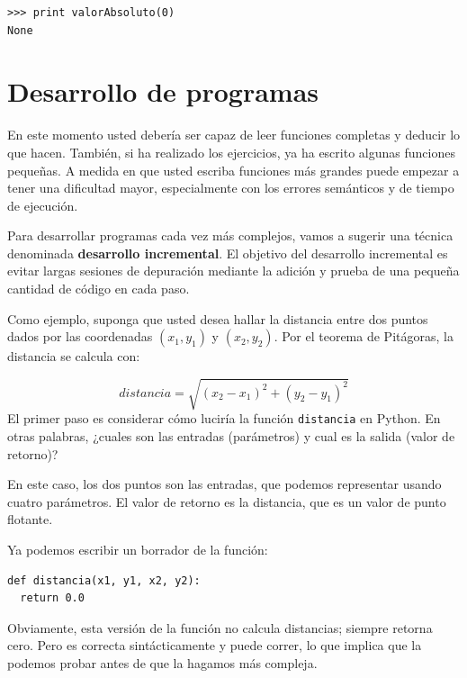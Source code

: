 
\beforeverb
\begin{verbatim}
>>> print valorAbsoluto(0)
None
\end{verbatim}
\afterverb



\section{Desarrollo de programas}
\label{program development}

En este momento usted debería ser capaz de leer funciones completas
y deducir lo que hacen. También, si ha realizado los ejercicios,
ya ha escrito algunas funciones pequeñas. A medida en que usted
escriba funciones más grandes puede empezar a tener una dificultad
mayor, especialmente con los errores semánticos y de tiempo de
ejecución.

Para desarrollar programas cada vez más complejos, vamos a sugerir
una técnica denominada {\bf desarrollo incremental}.  El objetivo
del desarrollo incremental es evitar largas sesiones de depuración
mediante la adición y prueba de una pequeña cantidad de código 
en cada paso.


Como ejemplo, suponga que usted desea hallar la distancia entre
dos puntos dados por las coordenadas  $(x_1, y_1)$ y $(x_2, y_2)$.
Por el teorema de Pitágoras, la distancia se calcula con:

\begin{equation}
distancia = \sqrt{(x_2 - x_1)^2 + (y_2 - y_1)^2}
\end{equation}
%
El primer paso es considerar cómo luciría la función \texttt{distancia}
en Python. En otras palabras, ¿cuales son las entradas (parámetros)
y cual es la salida (valor de retorno)?

En este caso, los dos puntos son las entradas, que podemos representar
usando cuatro parámetros. El valor de retorno es la distancia, que es
un valor de punto flotante.

Ya podemos escribir un borrador de la función:

\beforeverb
\begin{verbatim}
def distancia(x1, y1, x2, y2):
  return 0.0
\end{verbatim}
\afterverb
%
Obviamente, esta versión de la función no calcula distancias; siempre
retorna cero. Pero es correcta sintácticamente  y puede correr, 
lo que implica que la podemos probar antes de que la hagamos
más compleja.

